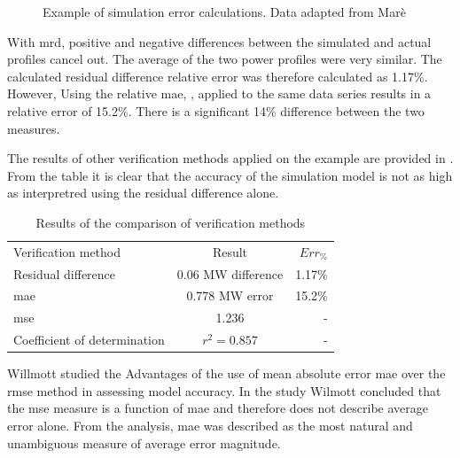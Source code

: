  		
 	\begin{figure}[!htbp]
 		\centering
 		
 		\caption[Example of simulation error calculations]{Example of simulation error calculations. Data adapted from Marè \cite{Mare2016PhD}}
 		\label{fig:Philipp Difference verify}
 	\end{figure}
 With \gls{mrd}, positive and negative differences between the simulated and actual profiles cancel out. The average of the two power profiles were very similar. The calculated residual difference relative error was therefore calculated as 1.17\%. However, Using the relative \gls{mae}, , applied to the same data series results in a relative error of 15.2\%. There is a significant 14\% difference between the two measures. 
 \par
 The results of other verification methods applied on the example are provided in . From the table it is clear that the accuracy of the simulation model is not as high as interpretred using the residual difference alone.
 \begin{table}[!htbp]
 	\centering
 	\begin{tabular}{lcr}
 		\hline
 		Verification method & Result & $Err_{\%}$\\
 		\hhline{===}
 		Residual difference     & 0.06 MW difference & 1.17\% \\
 		\gls{mae} 					 & 0.778 MW error & 15.2\% \\
 		\gls{mse} 				   & 1.236  & -\\
 		Coefficient of determination & $r^2 =0.857$  & -\\
 		\hline
 	\end{tabular} 
 \caption{Results of the comparison of verification methods}
 \label{Philip verification table}
 \end{table}
 
 	\par 
 	Willmott \cite{willmott2005advantages} studied the Advantages of the use of mean absolute error \gls{mae} over the \gls{rmse} method in assessing model accuracy. In the study Wilmott concluded that the \gls{mse} measure is a function of \gls{mae} and therefore does not describe average error alone. From the analysis, \gls{mae} was described as the most natural and unambiguous measure of average error magnitude.

